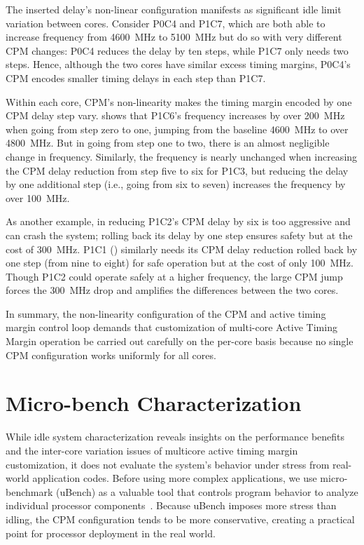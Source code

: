 The inserted delay's non-linear configuration manifests as significant idle limit variation between cores. Consider P0C4 and P1C7, which are both able to increase frequency from 4600~MHz to 5100~MHz but do so with very different CPM changes: P0C4 reduces the delay by ten steps, while P1C7 only needs two steps. Hence, although the two cores have similar excess timing margins, P0C4's CPM encodes smaller timing delays in each step than P1C7. 

Within each core, CPM's non-linearity makes the timing margin encoded by one CPM delay step vary.  shows that P1C6's frequency increases by over 200~MHz when going from step zero to one, jumping from the baseline 4600~MHz to over 4800~MHz. But in going from step one to two, there is an almost negligible change in frequency. Similarly, the frequency is nearly unchanged when increasing the CPM delay reduction from step five to six for P1C3, but reducing the delay by one additional step (i.e., going from six to seven) increases the frequency by over 100~MHz.

As another example, in  reducing P1C2's CPM delay by six is too aggressive and can crash the system; rolling back its delay by one step ensures safety but at the cost of 300~MHz. P1C1 () similarly needs its CPM delay reduction rolled back by one step (from nine to eight) for safe operation but at the cost of only 100~MHz. Though P1C2 could operate safely at a higher frequency, the large CPM jump forces the 300~MHz drop and amplifies the differences between the two cores.

In summary, the non-linearity configuration of the CPM and active timing margin control loop demands that customization of multi-core Active Timing Margin operation be carried out carefully on the per-core basis because no single CPM configuration works uniformly for all cores.

\section{Micro-bench Characterization}
\label{sec:process:ubench}



While idle system characterization reveals insights on the performance benefits and the inter-core variation issues of multicore active timing margin customization, it does not evaluate the system's behavior under stress from real-world application codes. Before using more complex applications, we use micro-benchmark (uBench) as a valuable tool that controls program behavior to analyze individual processor components~\cite{papadimitriou2018micro}. Because uBench imposes more stress than idling, the CPM configuration tends to be more conservative, creating a practical point for processor deployment in the real world.

